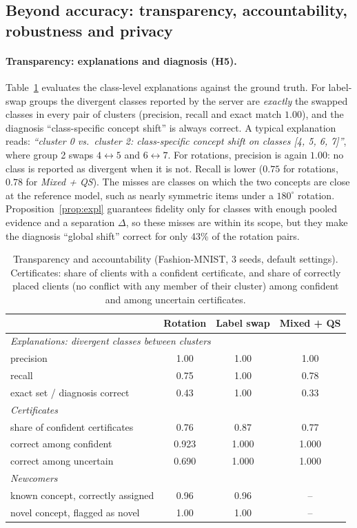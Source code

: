\subsection{Beyond accuracy: transparency, accountability, robustness and privacy}\label{sec:fat-exp}
\paragraph{Transparency: explanations and diagnosis (H5).}
Table~\ref{tab:fat} evaluates the class-level explanations against the ground truth. For label-swap groups the divergent classes reported by the server are \emph{exactly} the swapped classes in every pair of clusters (precision, recall and exact match $1.00$), and the diagnosis ``class-specific concept shift'' is always correct. A typical explanation reads: \emph{``cluster 0 vs.\ cluster 2: class-specific concept shift on classes [4, 5, 6, 7]''}, where group 2 swaps $4\leftrightarrow5$ and $6\leftrightarrow7$. For rotations, precision is again $1.00$: no class is reported as divergent when it is not. Recall is lower ($0.75$ for rotations, $0.78$ for \emph{Mixed + QS}). The misses are classes on which the two concepts are close at the reference model, such as nearly symmetric items under a $180^\circ$ rotation. Proposition~\ref{prop:expl} guarantees fidelity only for classes with enough pooled evidence and a separation $\Delta$, so these misses are within its scope, but they make the diagnosis ``global shift'' correct for only 43\% of the rotation pairs.

\begin{table}[!htbp]
\centering
\caption{Transparency and accountability (Fashion-MNIST, 3 seeds, default settings). Certificates: share of clients with a confident certificate, and share of correctly placed clients (no conflict with any member of their cluster) among confident and among uncertain certificates.}\label{tab:fat}
\small
\begin{tabular}{lccc}
\toprule
& Rotation & Label swap & Mixed + QS \\
\midrule
\multicolumn{4}{l}{\emph{Explanations: divergent classes between clusters}}\\
precision & 1.00 & 1.00 & 1.00 \\
recall & 0.75 & 1.00 & 0.78 \\
exact set / diagnosis correct & 0.43 & 1.00 & 0.33 \\
\midrule
\multicolumn{4}{l}{\emph{Certificates}}\\
share of confident certificates & 0.76 & 0.87 & 0.77 \\
correct among confident & 0.923 & 1.000 & 1.000 \\
correct among uncertain & 0.690 & 1.000 & 1.000 \\
\midrule
\multicolumn{4}{l}{\emph{Newcomers}}\\
known concept, correctly assigned & 0.96 & 0.96 & -- \\
novel concept, flagged as novel & 1.00 & 1.00 & -- \\
\bottomrule
\end{tabular}
\end{table}

